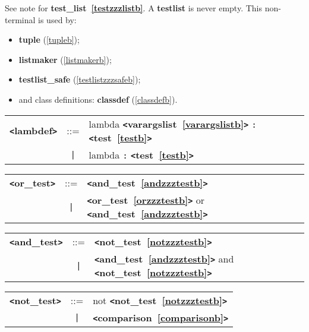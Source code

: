 See note for {\bf test\_{}list~\ref{testzzzlistb}}.  A {\bf testlist} is never empty.
This non-terminal is used by:

\begin{itemize}
\item \textbf{tuple} (\ref{tupleb});
\item \textbf{listmaker} (\ref{listmakerb});
\item \textbf{testlist\_safe} (\ref{testlistzzzsafeb});
\item and class definitions: \textbf{classdef} (\ref{classdefb}).
\end{itemize} 

\label{lambdefb}
\begin{tabular}{lcl}
{\bf \verb+<+lambdef\verb+>+} & ::=  & lambda {\bf \verb+<+varargslist~\ref{varargslistb}\verb+>+}  \verb|:| {\bf \verb+<+test~\ref{testb}\verb+>+}  \\
 & \verb+|+  & lambda \verb|:| {\bf \verb+<+test~\ref{testb}\verb+>+}  \\
\end{tabular}

\label{orzzztestb}
\begin{tabular}{lcl}
{\bf \verb+<+or\_test\verb+>+} & ::=  & {\bf \verb+<+and\_test~\ref{andzzztestb}\verb+>+}  \\
 & \verb+|+  & {\bf \verb+<+or\_test~\ref{orzzztestb}\verb+>+}  or {\bf \verb+<+and\_test~\ref{andzzztestb}\verb+>+}  \\
\end{tabular}

\label{andzzztestb}
\begin{tabular}{lcl}
{\bf \verb+<+and\_test\verb+>+} & ::=  & {\bf \verb+<+not\_test~\ref{notzzztestb}\verb+>+}  \\
 & \verb+|+  & {\bf \verb+<+and\_test~\ref{andzzztestb}\verb+>+}  and {\bf \verb+<+not\_test~\ref{notzzztestb}\verb+>+}  \\
\end{tabular}

\label{notzzztestb}
\begin{tabular}{lcl}
{\bf \verb+<+not\_test\verb+>+} & ::=  & not {\bf \verb+<+not\_test~\ref{notzzztestb}\verb+>+}  \\
 & \verb+|+  & {\bf \verb+<+comparison~\ref{comparisonb}\verb+>+}  \\
\end{tabular}

